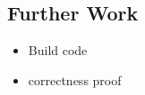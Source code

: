 \documentclass{article}
\begin{document}




\subsection{Further Work}

\begin{itemize}
  \item Build code
  \item correctness proof 
\end{itemize}

 

%











     
\end{document}
